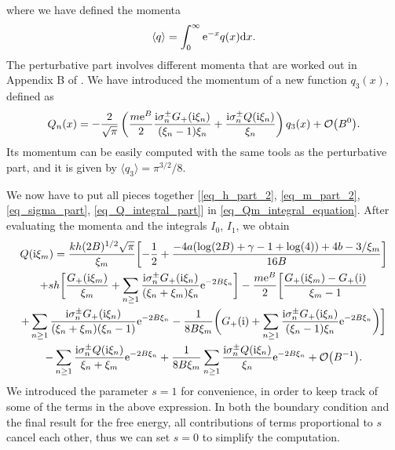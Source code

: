 \documentclass[a4paper,11pt]{article}
\theoremstyle{definition}
\newcommand{\re}{{\rm e}}
\newcommand{\ri}{{\rm i}}
\newcommand{\rd}{{\rm d}}
\begin{document}
where we have defined the momenta
\begin{equation}
\langle q \rangle = \int_0^\infty \re^{-x} q(x) \rd x.
\end{equation}
The perturbative part involves different momenta that are worked out in Appendix B of \cite{mmr-an}. We have introduced the momentum of a new function $q_3(x)$, defined as
\begin{equation}
Q_{n}(x) = -\frac{2}{\sqrt{\pi}} \left( \frac{m\re^B}{2} \frac{\ri\sigma^\pm_n G_+(\ri\xi_n)}{(\xi_n-1)\xi_n} + \frac{\ri\sigma^\pm_n Q(\ri\xi_n)}{\xi_n} \right) q_3(x) + \mathcal{O}\bigl(B^0\bigr).
\end{equation}
Its momentum can be easily computed with the same tools as the perturbative part, and it is given by $\langle q_3 \rangle = \pi^{3/2}/8$.

We now have to put all pieces together [\eqref{eq_h_part_2}, \eqref{eq_m_part_2}, \eqref{eq_sigma_part}, \eqref{eq_Q_integral_part}] in \eqref{eq_Qm_integral_equation}. After evaluating the momenta and the integrals $I_0$, $I_1$, we obtain
\begin{multline}
Q(\ri\xi_m) = \frac{kh(2B)^{1/2}\sqrt{\pi}}{\xi_m} \biggl[ -\frac{1}{2} + \frac{-4 a (\log(2B)+\gamma -1+\log (4))+4 b-3/\xi_m}{16 B}  \biggr]\\
+s h\biggl[ \frac{G_+(\ri\xi_m)}{\xi_m} + \sum_{n\ge 1} \frac{\ri \sigma^\pm_n G_+(\ri\xi_n)}{(\xi_n+\xi_m)\xi_n} \re^{-2B\xi_n} \biggr]
-\frac{m\re^B}{2}\biggl[ \frac{G_+(\ri\xi_m)-G_+(\ri)}{\xi_m-1}\\
+ \sum_{n\ge 1} \frac{\ri \sigma^\pm_n G_+(\ri\xi_n)}{(\xi_n+\xi_m)(\xi_n-1)} \re^{-2B\xi_n}
- \frac{1}{8B\xi_m}\biggl( G_+(\ri) + \sum_{n\ge 1}\frac{\ri\sigma^\pm_n G_+(\ri\xi_n)}{(\xi_n-1)\xi_n} \re^{-2B\xi_n} \biggr) \biggr]\\
- \sum_{n\ge 1} \frac{\ri\sigma^\pm_n Q(\ri\xi_n)}{\xi_n+\xi_m} \re^{-2B\xi_n} + \frac{1}{8 B \xi_m} \sum_{n\ge 1} \frac{\ri \sigma^\pm_n Q(\ri\xi_n)}{\xi_n} \re^{-2B\xi_n} + \mathcal{O}\big( B^{-1} \big).
\label{eq_Qm_implicit}
\end{multline}
We introduced the parameter $s=1$ for convenience, in order to keep track of some of the terms in the above expression. In both the boundary condition and the final result for the free energy, all contributions of terms proportional to $s$ cancel each other, thus we can set $s=0$ to simplify the computation.
\end{document}
